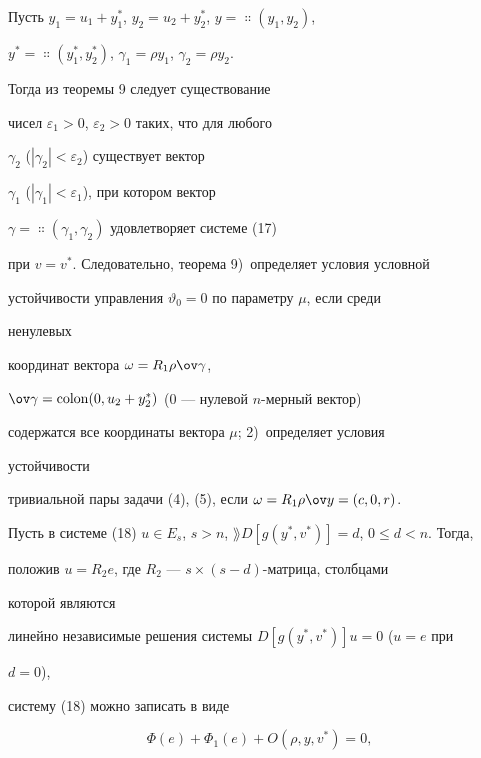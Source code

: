 


\begin{note} 


Пусть $y_1=u_1+y^*_1$, $y_2=u_2+y^*_2$, $y=\Colon(y_1,y_2)$, 


$y^*=\Colon(y^*_1,y^*_2)$, $\gamma_1=\rho y_1$, $\gamma_2=\rho y_2$. 


Тогда из теоремы 9 следует существование 


чисел $\varepsilon_1>0$, $\varepsilon_2>0$ таких, что для любого 


$\gamma_2$ ($|\gamma_2|<\varepsilon_2$) существует вектор 


$\gamma_1$ ($|\gamma_1|<\varepsilon_1$), при котором вектор 


$\gamma=\Colon(\gamma_1,\gamma_2)$ удовлетворяет системе (17) 


при $v=v^*$. Следовательно, теорема 9)~определяет условия условной 


устойчивости управления $\vartheta_0=0$ по параметру $\mu$, если среди 


ненулевых 


координат вектора $\omega=R_1\rho\ov\gamma$, 


$\ov\gamma=\Colon(0,u_2+y^*_2)$ (0 --- нулевой $n$-мерный вектор) 


содержатся все координаты вектора $\mu$; 2)~определяет условия 


устойчивости 


тривиальной пары задачи (4), (5), если $\omega=R_1\rho\ov y=(c,0,r)$. 


\end{note} 


 


Пусть в системе (18) $u\in E_s$, $s>n$, $\rang D[g(y^*,v^*)]=d$, $0\le 


d<n$. Тогда, 


положив $u=R_2e$, где $R_2$ --- $s\times(s{-}d)$-матрица, столбцами 


которой являются 


линейно независимые решения системы $D[g(y^*,v^*)]u=0$ ($u=e$ при 


$d=0$), 


систему (18) можно записать в виде 


\begin{equation} 


\Phi(e)+\Phi_1(e)+O(\rho,y,v^*)=0, 


\end{equation} 


